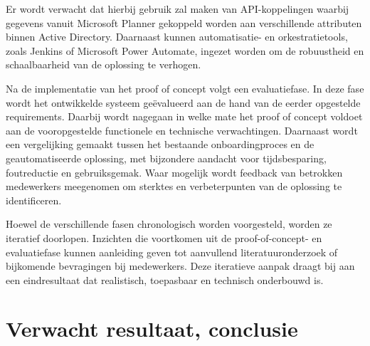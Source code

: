 Er wordt verwacht dat hierbij gebruik zal maken van API-koppelingen waarbij gegevens vanuit Microsoft Planner gekoppeld worden aan verschillende attributen binnen Active Directory. Daarnaast kunnen automatisatie- en orkestratietools, zoals Jenkins of Microsoft Power Automate, ingezet worden om de robuustheid en schaalbaarheid van de oplossing te verhogen.

Na de implementatie van het proof of concept volgt een evaluatiefase. In deze fase wordt het ontwikkelde systeem geëvalueerd aan de hand van de eerder opgestelde requirements. Daarbij wordt nagegaan in welke mate het proof of concept voldoet aan de vooropgestelde functionele en technische verwachtingen. Daarnaast wordt een vergelijking gemaakt tussen het bestaande onboardingproces en de geautomatiseerde oplossing, met bijzondere aandacht voor tijdsbesparing, foutreductie en gebruiksgemak. Waar mogelijk wordt feedback van betrokken medewerkers meegenomen om sterktes en verbeterpunten van de oplossing te identificeren.

Hoewel de verschillende fasen chronologisch worden voorgesteld, worden ze iteratief doorlopen. Inzichten die voortkomen uit de proof-of-concept- en evaluatiefase kunnen aanleiding geven tot aanvullend literatuuronderzoek of bijkomende bevragingen bij medewerkers. Deze iteratieve aanpak draagt bij aan een eindresultaat dat realistisch, toepasbaar en technisch onderbouwd is.




\section{Verwacht resultaat, conclusie}%
\label{sec:verwachte_resultaten}




